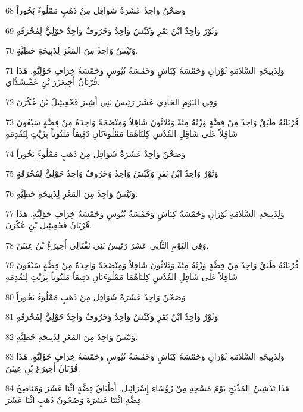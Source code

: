 \par 68 وَصَحْنٌ وَاحِدٌ عَشَرَةُ شَوَاقِل مِنْ ذَهَبٍ مَمْلُوءٌ بَخُوراً
\par 69 وَثَوْرٌ وَاحِدٌ ابْنُ بَقَرٍ وَكَبْشٌ وَاحِدٌ وَخَرُوفٌ وَاحِدٌ حَوْلِيٌّ لِمُحْرَقَةٍ
\par 70 وَتَيْسٌ وَاحِدٌ مِنَ المَعْزِ لِذَبِيحَةِ خَطِيَّةٍ.
\par 71 وَلِذَبِيحَةِ السَّلامَةِ ثَوْرَانِ وَخَمْسَةُ كِبَاشٍ وَخَمْسَةُ تُيُوسٍ وَخَمْسَةُ خِرَافٍ حَوْلِيَّةٍ. هَذَا قُرْبَانُ أَخِيعَزَرَ بْنِ عَمِّيشَدَّاي.
\par 72 وَفِي اليَوْمِ الحَادِي عَشَرَ رَئِيسُ بَنِي أَشِيرَ فَجْعِيئِيلُ بْنُ عُكْرَنَ.
\par 73 قُرْبَانُهُ طَبَقٌ وَاحِدٌ مِنْ فِضَّةٍ وَزْنُهُ مِئَةٌ وَثَلاثُونَ شَاقِلاً وَمِنْضَحَةٌ وَاحِدَةٌ مِنْ فِضَّةٍ سَبْعُونَ شَاقِلاً عَلى شَاقِلِ القُدْسِ كِلتَاهُمَا مَمْلُوءَتَانِ دَقِيقاً مَلتُوتاً بِزَيْتٍ لِتَقْدِمَةٍ
\par 74 وَصَحْنٌ وَاحِدٌ عَشَرَةُ شَوَاقِل مِنْ ذَهَبٍ مَمْلُوءٌ بَخُوراً
\par 75 وَثَوْرٌ وَاحِدٌ ابْنُ بَقَرٍ وَكَبْشٌ وَاحِدٌ وَخَرُوفٌ وَاحِدٌ حَوْلِيٌّ لِمُحْرَقَةٍ
\par 76 وَتَيْسٌ وَاحِدٌ مِنَ المَعْزِ لِذَبِيحَةِ خَطِيَّةٍ.
\par 77 وَلِذَبِيحَةِ السَّلامَةِ ثَوْرَانِ وَخَمْسَةُ كِبَاشٍ وَخَمْسَةُ تُيُوسٍ وَخَمْسَةُ خِرَافٍ حَوْلِيَّةٍ. هَذَا قُرْبَانُ فَجْعِيئِيل بْنِ عُكْرَنَ.
\par 78 وَفِي اليَوْمِ الثَّانِي عَشَرَ رَئِيسُ بَنِي نَفْتَالِي أَخِيرَعُ بْنُ عِينَنَ.
\par 79 قُرْبَانُهُ طَبَقٌ وَاحِدٌ مِنْ فِضَّةٍ وَزْنُهُ مِئَةٌ وَثَلاثُونَ شَاقِلاً وَمِنْضَحَةٌ وَاحِدَةٌ مِنْ فِضَّةٍ سَبْعُونَ شَاقِلاً عَلى شَاقِلِ القُدْسِ كِلتَاهُمَا مَمْلُوءَتَانِ دَقِيقاً مَلتُوتاً بِزَيْتٍ لِتَقْدِمَةٍ
\par 80 وَصَحْنٌ وَاحِدٌ عَشَرَةُ شَوَاقِل مِنْ ذَهَبٍ مَمْلُوءٌ بَخُوراً
\par 81 وَثَوْرٌ وَاحِدٌ ابْنُ بَقَرٍ وَكَبْشٌ وَاحِدٌ وَخَرُوفٌ وَاحِدٌ حَوْلِيٌّ لِمُحْرَقَةٍ
\par 82 وَتَيْسٌ وَاحِدٌ مِنَ المَعْزِ لِذَبِيحَةِ خَطِيَّةٍ.
\par 83 وَلِذَبِيحَةِ السَّلامَةِ ثَوْرَانِ وَخَمْسَةُ كِبَاشٍ وَخَمْسَةُ تُيُوسٍ وَخَمْسَةُ خِرَافٍ حَوْلِيَّةٍ. هَذَا قُرْبَانُ أَخِيرَعَ بْنِ عِينَنَ.
\par 84 هَذَا تَدْشِينُ المَذْبَحِ يَوْمَ مَسْحِهِ مِنْ رُؤَسَاءِ إِسْرَائِيل. أَطْبَاقُ فِضَّةٍ اثْنَا عَشَرَ وَمَنَاضِحُ فِضَّةٍ اثْنَتَا عَشرَةَ وَصُحُونُ ذَهَبٍ اثْنَا عَشَرَ
